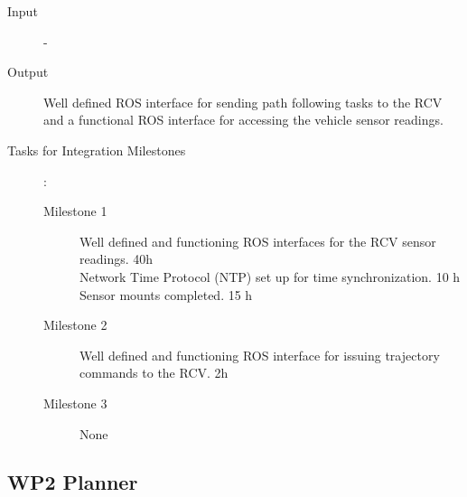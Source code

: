 \documentclass[11pt,a4paper]{article}
\begin{document}
\begin{description}
   
\item[Input] -
\item[Output] Well defined ROS interface for sending path following tasks to the RCV and a functional ROS interface for accessing the vehicle sensor readings.
\item[Tasks for Integration Milestones]:\
	\begin{description}
		\item[Milestone 1] Well defined and functioning ROS interfaces for the RCV sensor readings. 40h\\
  Network Time Protocol (NTP) set up for time synchronization. 10 h\\
  Sensor mounts completed. 15 h 
		\item[Milestone 2] Well defined and functioning ROS interface for issuing trajectory commands to the RCV. 2h
		\item[Milestone 3] None
	\end{description}	 
\end{description}

\subsection{WP2 Planner}
\end{document}
